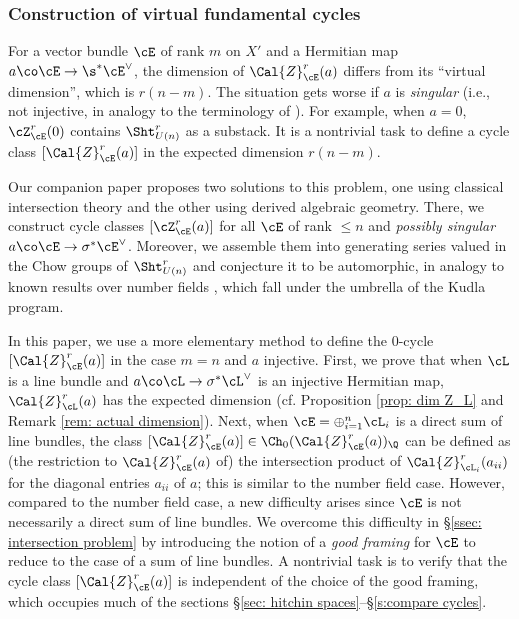 \subsubsection{Construction of virtual fundamental cycles}
For a vector bundle $\cE$ of rank $m$ on $X'$ and a Hermitian map $a\co \cE\to \s^{*}\cE^{\vee}$,  the dimension of $\Cal{Z}_{\cE}^r(a)$ differs from its ``virtual dimension'', which is $r(n-m)$. The situation gets worse if $a$ is {\em singular} (i.e., not injective, in analogy to the terminology of \cite{KRII}). For example, when $a=0$, $\cZ^{r}_{\cE}(0)$ contains $\Sht^{r}_{U(n)}$ as a substack. It is a nontrivial task to define a cycle class $[\Cal{Z}_{\cE}^r(a)]$ in the expected dimension $r(n-m)$.

Our companion paper \cite{FYZ2} proposes two solutions to this problem, one using classical intersection theory and the other using derived algebraic geometry. There, we construct cycle classes $[\cZ^{r}_{\cE}(a)]$ for all $\cE$ of rank $\le n$ and \emph{possibly singular} $a \co \cE \rightarrow \sigma^* \cE^{\vee}$. Moreover,  we assemble them into generating series valued in the Chow groups of $\Sht_{U(n)}^r$ and conjecture it to be automorphic, in analogy to known results over number fields \cite{BHKRY1}, which fall under the umbrella of the Kudla program.


In this paper, we use a more elementary method to define the $0$-cycle $[\Cal{Z}_{\cE}^r(a)]$ in the case $m=n$ and $a$ injective. First, we prove that when $\cL$ is a line bundle and $a \co \cL \rightarrow \sigma^* \cL^{\vee}$ is an injective Hermitian map, $\Cal{Z}_{\cL}^r(a)$ has the expected dimension (cf. Proposition \ref{prop: dim Z_L} and Remark \ref{rem: actual dimension}). Next, when $\cE=\oplus_{i=1}^n \cL_i$ is a direct sum of line bundles, the class $[\Cal{Z}_{\cE}^r(a) ] \in \Ch_0(\Cal{Z}_{\cE}^r(a))_{\Q}$ can be defined as (the restriction to $\Cal{Z}_{\cE}^r(a)$ of) the intersection product of $\Cal{Z}_{\cL_i}^r(a_{ii})$ for the diagonal entries $a_{ii}$ of $a$; this is similar to the number field case.  However, compared to the number field case, a new difficulty arises since $\cE$ is not necessarily a direct sum of line bundles. We overcome this difficulty in \S\ref{ssec: intersection problem} by introducing the notion of a \emph{good framing} for $\cE$ to reduce to the case of a sum of line bundles. A nontrivial task is to verify that the cycle class $[\Cal{Z}_{\cE}^r(a) ]$ is independent of the choice of the good framing, which occupies much of the sections \S\ref{sec: hitchin spaces}--\S\ref{s:compare cycles}.


